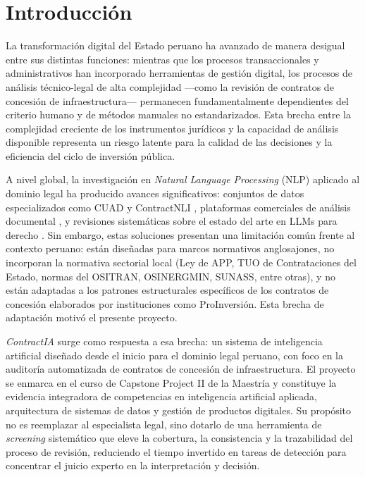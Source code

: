 \chapter{Introducción}

La transformación digital del Estado peruano ha avanzado de manera desigual entre
sus distintas funciones: mientras que los procesos transaccionales y administrativos
han incorporado herramientas de gestión digital, los procesos de análisis técnico-legal
de alta complejidad ---como la revisión de contratos de concesión de infraestructura---
permanecen fundamentalmente dependientes del criterio humano y de métodos manuales
no estandarizados. Esta brecha entre la complejidad creciente de los instrumentos
jurídicos y la capacidad de análisis disponible representa un riesgo latente para
la calidad de las decisiones y la eficiencia del ciclo de inversión pública.

A nivel global, la investigación en \textit{Natural Language Processing} (NLP)
aplicado al dominio legal ha producido avances significativos: conjuntos de datos
especializados como CUAD \cite{hendrycks2021cuad} y ContractNLI
\cite{koreeda2021contractnli}, plataformas comerciales de análisis documental
\cite{google_contract_docai_2021, ibm_watsonx_contracts_2024}, y revisiones
sistemáticas sobre el estado del arte en LLMs para derecho \cite{singh2025survey}.
Sin embargo, estas soluciones presentan una limitación común frente al contexto
peruano: están diseñadas para marcos normativos anglosajones, no incorporan la
normativa sectorial local (Ley de APP, TUO de Contrataciones del Estado, normas
del OSITRAN, OSINERGMIN, SUNASS, entre otras), y no están adaptadas a los
patrones estructurales específicos de los contratos de concesión elaborados por
instituciones como ProInversión. Esta brecha de adaptación motivó el presente proyecto.

\textit{ContractIA} surge como respuesta a esa brecha: un sistema de inteligencia
artificial diseñado desde el inicio para el dominio legal peruano, con foco en la
auditoría automatizada de contratos de concesión de infraestructura. El proyecto
se enmarca en el curso de Capstone Project II de la Maestría y constituye la
evidencia integradora de competencias en inteligencia artificial aplicada,
arquitectura de sistemas de datos y gestión de productos digitales. Su propósito
no es reemplazar al especialista legal, sino dotarlo de una herramienta de
\textit{screening} sistemático que eleve la cobertura, la consistencia y la
trazabilidad del proceso de revisión, reduciendo el tiempo invertido en tareas
de detección para concentrar el juicio experto en la interpretación y decisión.

